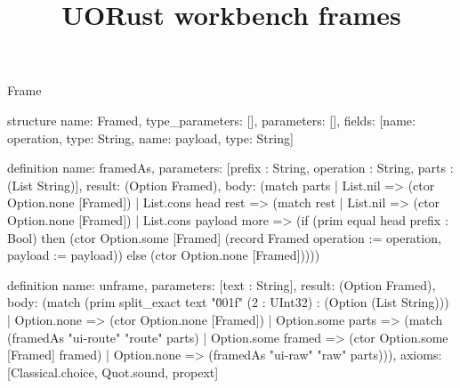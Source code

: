 \begin{lexlean}{Frame}
\title{UORust workbench frames}
\begin{semanticmodule}
structure{
  name: Framed,
  type_parameters: [],
  parameters: [],
  fields: [{name: operation, type: String}, {name: payload, type: String}]
}

definition{
  name: framedAs,
  parameters: [prefix : String, operation : String, parts : (List String)],
  result: (Option Framed),
  body: (match parts
    | List.nil => (ctor Option.none [Framed])
    | List.cons head rest => (match rest
      | List.nil => (ctor Option.none [Framed])
      | List.cons payload more => (if (prim equal head prefix : Bool) then (ctor Option.some [Framed] (record Framed {operation := operation, payload := payload})) else (ctor Option.none [Framed]))))
}

definition{
  name: unframe,
  parameters: [text : String],
  result: (Option Framed),
  body: (match (prim split_exact text "\u001f" (2 : UInt32) : (Option (List String)))
    | Option.none => (ctor Option.none [Framed])
    | Option.some parts => (match (framedAs "ui-route" "route" parts)
      | Option.some framed => (ctor Option.some [Framed] framed)
      | Option.none => (framedAs "ui-raw" "raw" parts))),
  axioms: [Classical.choice, Quot.sound, propext]
}


\end{semanticmodule}
\end{lexlean}
